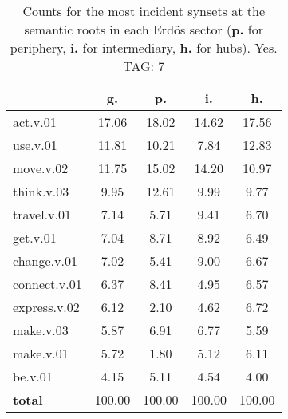 \begin{table}[h!]
\begin{center}
\begin{tabular}{| l || c | c | c | c |}\hline
 & {\bf g.} & {\bf p.} & {\bf i.} & {\bf h.} \\\hline\hline
act.v.01 & 17.06  & 18.02  & 14.62  & 17.56 \\\hline
use.v.01 & 11.81  & 10.21  & 7.84  & 12.83 \\\hline
move.v.02 & 11.75  & 15.02  & 14.20  & 10.97 \\\hline
think.v.03 & 9.95  & 12.61  & 9.99  & 9.77 \\\hline
travel.v.01 & 7.14  & 5.71  & 9.41  & 6.70 \\\hline
get.v.01 & 7.04  & 8.71  & 8.92  & 6.49 \\\hline
change.v.01 & 7.02  & 5.41  & 9.00  & 6.67 \\\hline
connect.v.01 & 6.37  & 8.41  & 4.95  & 6.57 \\\hline
express.v.02 & 6.12  & 2.10  & 4.62  & 6.72 \\\hline
make.v.03 & 5.87  & 6.91  & 6.77  & 5.59 \\\hline
make.v.01 & 5.72  & 1.80  & 5.12  & 6.11 \\\hline
be.v.01 & 4.15  & 5.11  & 4.54  & 4.00 \\\hline\hline
{{\bf total}} & 100.00  & 100.00  & 100.00  & 100.00 \\\hline
\end{tabular}
\caption{Counts for the most incident synsets at the semantic roots in each Erd\"os sector ({\bf p.} for periphery, {\bf i.} for intermediary, {\bf h.} for hubs). Yes. TAG: 7}
\end{center}
\end{table}